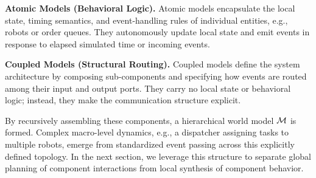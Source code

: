 \textbf{Atomic Models (Behavioral Logic).} Atomic models encapsulate the local state, timing semantics, and event-handling rules of individual entities, e.g., robots or order queues. They autonomously update local state and emit events in response to elapsed simulated time or incoming events.

\textbf{Coupled Models (Structural Routing).} Coupled models define the system architecture by composing sub-components and specifying how events are routed among their input and output ports. They carry no local state or behavioral logic; instead, they make the communication structure explicit.

By recursively assembling these components, a hierarchical world model $\mathcal{M}$ is formed. Complex macro-level dynamics, e.g., a dispatcher assigning tasks to multiple robots, emerge from standardized event passing across this explicitly defined topology. In the next section, we leverage this structure to separate global planning of component interactions from local synthesis of component behavior.
